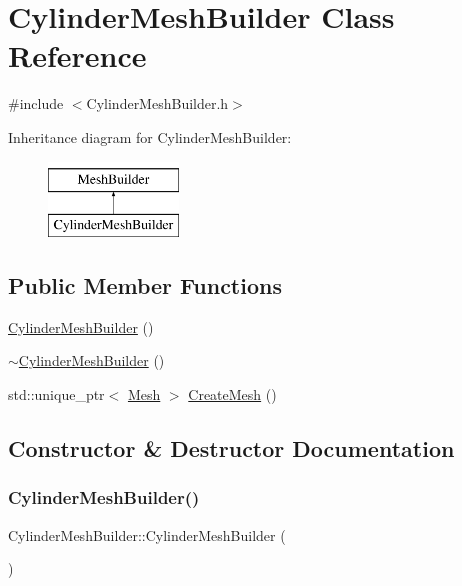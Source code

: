 \hypertarget{class_cylinder_mesh_builder}{}\section{Cylinder\+Mesh\+Builder Class Reference}
\label{class_cylinder_mesh_builder}


{\ttfamily \#include $<$Cylinder\+Mesh\+Builder.\+h$>$}

Inheritance diagram for Cylinder\+Mesh\+Builder\+:\begin{figure}[H]
\begin{center}
\leavevmode
\includegraphics[height=2.000000cm]{class_cylinder_mesh_builder}
\end{center}
\end{figure}
\subsection*{Public Member Functions}
\begin{DoxyCompactItemize}
\item 
\mbox{\hyperlink{class_cylinder_mesh_builder_a6362329f318def1b3fb7a7baeaf1957d}{Cylinder\+Mesh\+Builder}} ()
\item 
\mbox{\hyperlink{class_cylinder_mesh_builder_a2a95f192993e407f42001d64340f8f7d}{$\sim$\+Cylinder\+Mesh\+Builder}} ()
\item 
std\+::unique\+\_\+ptr$<$ \mbox{\hyperlink{class_mesh}{Mesh}} $>$ \mbox{\hyperlink{class_cylinder_mesh_builder_a266221f05078711983a5c40f3edb58ba}{Create\+Mesh}} ()
\end{DoxyCompactItemize}


\subsection{Constructor \& Destructor Documentation}
\mbox{\label{class_cylinder_mesh_builder_a6362329f318def1b3fb7a7baeaf1957d}} 
\subsubsection{\texorpdfstring{CylinderMeshBuilder()}{CylinderMeshBuilder()}}
{\footnotesize\ttfamily Cylinder\+Mesh\+Builder\+::\+Cylinder\+Mesh\+Builder (\begin{DoxyParamCaption}{ }\end{DoxyParamCaption})}

